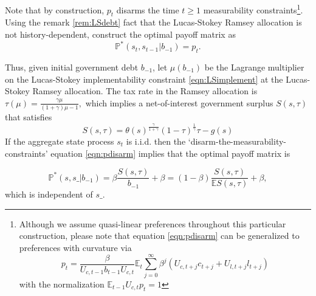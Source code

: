 \documentclass[12pt]{article}
\newcommand{\EE}{\mathbb E}
\begin{document}
Note that by construction, $p_t$   disarms the time  $t\geq 1$
measurability constraints\footnote{Although we assume  quasi-linear preferences throughout  this particular construction, please note that equation \eqref{eqn:pdisarm} can be generalized to preferences with curvature via
\[
p_t =  \frac{\beta}{U_{c,t-1}b_{t-1}U_{c,t}}\EE_t\sum_{j=0}^\infty\beta^j\left( U_{c,t+j}c_{t+j}+U_{l,t+j}l_{t+j}\right) \]
with the normalization $\EE_{t-1}U_{c,t}p_t = 1$}.  Using the remark \ref{rem:LSdebt} fact that the Lucas-Stokey Ramsey allocation is not history-dependent,  construct the optimal payoff matrix as
\[\mathbb{P}^*(s_t,s_{t-1}|b_{-1})=p_t.\]

Thus,  given
 initial government debt $b_{-1}$,  let $\mu(b_{-1})$ be the Lagrange multiplier on the Lucas-Stokey implementability constraint \eqref{eqn:LSimplement}
 at the Lucas-Stokey Ramsey allocation.   The tax rate in the Ramsey allocation is
$
		\tau(\mu) = \frac{\gamma\mu}{(1+\gamma)\mu-1},
	$
 which implies a  net-of-interest government surplus $S(s,\tau)$ that satisfies
\[		S(s,\tau) = \theta(s)^\frac\gamma{1+\gamma}(1-\tau)^\frac1\gamma\tau-g(s)
	\]
If the aggregate state process $s_t$ is i.i.d. then the `disarm-the-measurability-constraints' equation \eqref{eqn:pdisarm} implies that the optimal payoff matrix is

\begin{equation}\label{eqn:optPP}
 \mathbb{P}^*(s, s\_ |b_{-1}) = \beta\frac{S(s,\tau)}{b_{-1}} + \beta=(1-\beta)\frac{S(s,\tau)}{\EE S(s,\tau)} + \beta,
 \end{equation} which is independent of $s\_$.
\end{document}
